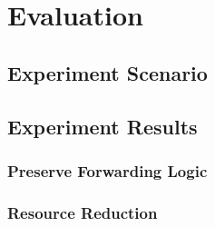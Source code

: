 \section{Evaluation}

\subsection{Experiment Scenario}


\subsection{Experiment Results}

\subsubsection{Preserve Forwarding Logic}


\subsubsection{Resource Reduction}

